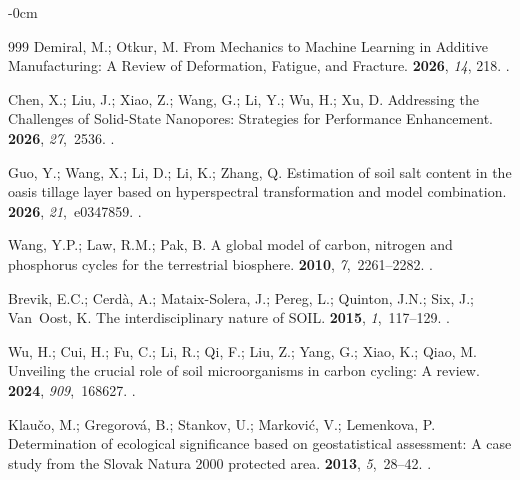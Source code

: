 \documentclass[environremediat,article,accept,pdftex,oneauthor]{Definitions/mdpi}
\begin{document}
\begin{adjustwidth}{-\extralength}{0cm}
\begin{thebibliography}{999}
Demiral, M.; Otkur, M.
\newblock From Mechanics to Machine Learning in Additive Manufacturing: A
  Review of Deformation, Fatigue, and Fracture.
 {\bf 2026}, {\em 14}, 218.
.

Chen, X.; Liu, J.; Xiao, Z.; Wang, G.; Li, Y.; Wu, H.; Xu, D.
\newblock Addressing the Challenges of Solid-State Nanopores: Strategies for
  Performance Enhancement.
 {\bf 2026}, {\em
  27},~2536.
.

Guo, Y.; Wang, X.; Li, D.; Li, K.; Zhang, Q.
\newblock Estimation of soil salt content in the oasis tillage layer based on
  hyperspectral transformation and model combination.
 {\bf 2026}, {\em 21},~e0347859.
.

Wang, Y.P.; Law, R.M.; Pak, B.
\newblock A global model of carbon, nitrogen and phosphorus cycles for the
  terrestrial biosphere.
 {\bf 2010}, {\em 7},~2261--2282.
.

Brevik, E.C.; Cerdà, A.; Mataix-Solera, J.; Pereg, L.; Quinton, J.N.; Six, J.;
  Van~Oost, K.
\newblock The interdisciplinary nature of SOIL.
 {\bf 2015}, {\em 1},~117--129.
.

Wu, H.; Cui, H.; Fu, C.; Li, R.; Qi, F.; Liu, Z.; Yang, G.; Xiao, K.; Qiao, M.
\newblock Unveiling the crucial role of soil microorganisms in carbon cycling:
  A review.
 {\bf 2024}, {\em 909},~168627.
.

Klau\v{c}o, M.; Gregorov{\'a}, B.; Stankov, U.; Markovi{\'c}, V.; Lemenkova, P.
\newblock Determination of ecological significance based on geostatistical
  assessment: A case study from the Slovak Natura 2000 protected area.
 {\bf 2013}, {\em 5},~28--42.
.


\end{thebibliography}
\end{adjustwidth}
\end{document}
